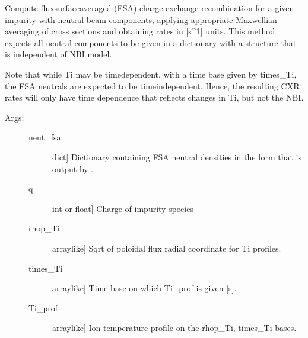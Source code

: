 \documentclass[letterpaper,10pt,english]{sphinxmanual}
\begin{document}

\begin{fulllineitems}
\label{\detokenize{aurora:aurora.nbi_neutrals.get_NBI_imp_cxr_q}}
Compute flux\sphinxhyphen{}surface\sphinxhyphen{}averaged (FSA) charge exchange recombination for a given impurity with
neutral beam components, applying appropriate Maxwellian averaging of cross sections and
obtaining rates in {[}s\textasciicircum{}\sphinxhyphen{}1{]} units. This method expects all neutral components to be given in a
dictionary with a structure that is independent of NBI model.

Note that while Ti may be time\sphinxhyphen{}dependent, with a time base given by times\_Ti, the FSA
neutrals are expected to be time\sphinxhyphen{}independent. Hence, the resulting CXR rates will only have
time dependence that reflects changes in Ti, but not the NBI.
\begin{description}
\item[{Args:}] \leavevmode\begin{description}
\item[{neut\_fsa}] \leavevmode{[}dict{]}
Dictionary containing FSA neutral densities in the form that is output by {\hyperref[\detokenize{aurora:aurora.nbi_neutrals.get_neutrals_fsa}]{}}.

\item[{q}] \leavevmode{[}int or float{]}
Charge of impurity species

\item[{rhop\_Ti}] \leavevmode{[}array\sphinxhyphen{}like{]}
Sqrt of poloidal flux radial coordinate for Ti profiles.

\item[{times\_Ti}] \leavevmode{[}array\sphinxhyphen{}like{]}
Time base on which Ti\_prof is given {[}s{]}.

\item[{Ti\_prof}] \leavevmode{[}array\sphinxhyphen{}like{]}
Ion temperature profile on the rhop\_Ti, times\_Ti bases.


\end{description}
\end{description}
\end{fulllineitems}
\end{document}
